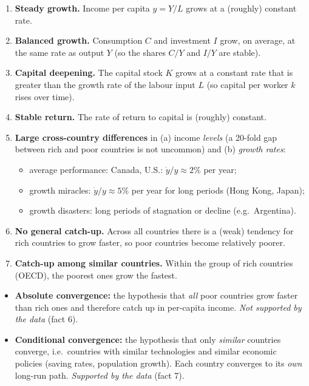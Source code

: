 \begin{enumerate}
  \item \textbf{Steady growth.} Income per capita $y=Y/L$ grows at a (roughly) constant rate.
  \item \textbf{Balanced growth.} Consumption $C$ and investment $I$ grow, on average, at the same rate as output $Y$ (so the shares $C/Y$ and $I/Y$ are stable).
  \item \textbf{Capital deepening.} The capital stock $K$ grows at a constant rate that is greater than the growth rate of the labour input $L$ (so capital per worker $k$ rises over time).
  \item \textbf{Stable return.} The rate of return to capital is (roughly) constant.
  \item \textbf{Large cross-country differences} in (a) income \emph{levels} (a 20-fold gap between rich and poor countries is not uncommon) and (b) \emph{growth rates}:
  \begin{itemize}
    \item average performance: Canada, U.S.: $\dot y/y\approx 2\%$ per year;
    \item growth miracles: $\dot y/y\approx 5\%$ per year for long periods (Hong Kong, Japan);
    \item growth disasters: long periods of stagnation or decline (e.g.\ Argentina).
  \end{itemize}
  \item \textbf{No general catch-up.} Across all countries there is a (weak) tendency for rich countries to grow faster, so poor countries become relatively poorer.
  \item \textbf{Catch-up among similar countries.} Within the group of rich countries (OECD), the poorest ones grow the fastest.
\end{enumerate}

\begin{keybox}[title=Absolute vs.\ conditional convergence]
\begin{itemize}
  \item \textbf{Absolute convergence:} the hypothesis that \emph{all} poor countries grow faster than rich ones and therefore catch up in per-capita income. \emph{Not supported by the data} (fact 6).
  \item \textbf{Conditional convergence:} the hypothesis that only \emph{similar} countries converge, i.e.\ countries with similar technologies and similar economic policies (saving rates, population growth). Each country converges to its \emph{own} long-run path. \emph{Supported by the data} (fact 7).
\end{itemize}
\end{keybox}

